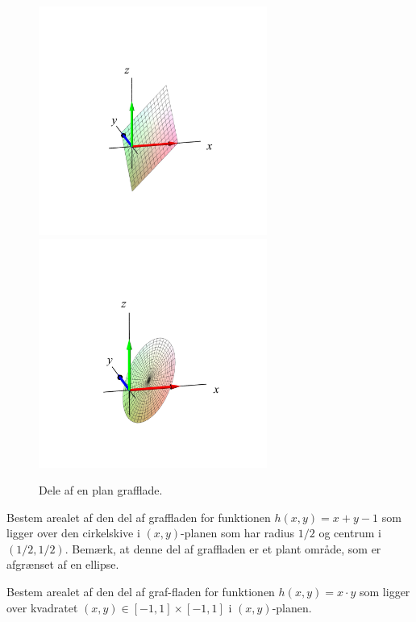 \begin{figure}[ht]
\centerline{\includegraphics[height=75mm]{FIGS/plotGrafFlat1} \qquad \qquad \includegraphics[height=75mm]{FIGS/plotGrafFlat2}}
\begin{center}
\caption{\small{Dele af en plan grafflade.}} \label{figGrafFlat}
\end{center}
\end{figure}


\begin{exercise} \label{exercCirkulfareal}
Bestem arealet af den del af graffladen for funktionen $h(x,y) = x+y-1 $ som ligger over den cirkelskive i $(x,y)$-planen som har radius $1/2$ og centrum i $(1/2, 1/2)$. Bemærk, at denne del af graffladen er et plant område, som er afgrænset af en ellipse.
\end{exercise}


\begin{exercise} \label{exercRektangUVareal}
Bestem arealet af den del af graf-fladen for funktionen $h(x,y) = x\cdot y$ som ligger over kvad\-ra\-tet $(x,y) \in [-1,1]\times [-1,1]$ i $(x,y)$-planen.
\end{exercise}

